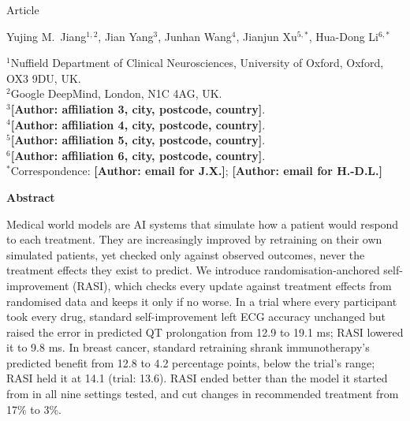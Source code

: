 \documentclass[11pt,a4paper]{article}
\newcommand{\authorpending}[1]{{\color{red}\textbf{[Author: #1]}}}
\begin{document}
{\large Article\par}\vspace{1.2em}
\vspace{1.1em}
{\large Yujing M.\ Jiang$^{1,2}$, Jian Yang$^{3}$, Junhan Wang$^{4}$, Jianjun Xu$^{5,*}$, Hua-Dong Li$^{6,*}$\par}
\vspace{0.9em}
{\small\raggedright
$^{1}$Nuffield Department of Clinical Neurosciences, University of Oxford, Oxford, OX3 9DU, UK.\\
$^{2}$Google DeepMind, London, N1C 4AG, UK.\\
$^{3}$\authorpending{affiliation 3, city, postcode, country}.\\
$^{4}$\authorpending{affiliation 4, city, postcode, country}.\\
$^{5}$\authorpending{affiliation 5, city, postcode, country}.\\
$^{6}$\authorpending{affiliation 6, city, postcode, country}.\\
$^{*}$Correspondence: \authorpending{email for J.X.}; \authorpending{email for H.-D.L.}\par}

\vspace{0.6em}

{\normalsize\bfseries Abstract\par}\vspace{0.4em}
Medical world models are AI systems that simulate how a patient would respond to each treatment. They are increasingly improved by retraining on their own simulated patients, yet checked only against observed outcomes, never the treatment effects they exist to predict. We introduce randomisation-anchored self-improvement (RASI), which checks every update against treatment effects from randomised data and keeps it only if no worse. In a trial where every participant took every drug, standard self-improvement left ECG accuracy unchanged but raised the error in predicted QT prolongation from 12.9 to 19.1 ms; RASI lowered it to 9.8 ms. In breast cancer, standard retraining shrank immunotherapy's predicted benefit from 12.8 to 4.2 percentage points, below the trial's range; RASI held it at 14.1 (trial: 13.6). RASI ended better than the model it started from in all nine settings tested, and cut changes in recommended treatment from 17\% to 3\%.
\par\vspace{1.2em}
\end{document}
